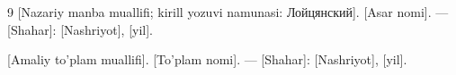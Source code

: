 \clearpage
{}
\begin{thebibliography}{9}
  [Nazariy manba muallifi; kirill yozuvi namunasi: Лойцянский].
  [Asar nomi]. --- [Shahar]: [Nashriyot], [yil].

  [Amaliy to’plam muallifi]. [To’plam nomi]. --- [Shahar]: [Nashriyot], [yil].
\end{thebibliography}
